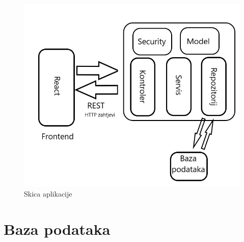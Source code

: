 \begin{figure}[H]
\includegraphics[scale=0.4]{slike/Skica_aplikacije.png} %
\centering
\caption{Skica aplikacije}
\label{fig:aplikacija}
\end{figure}


	
		

		

				
		\section{Baza podataka}
			
